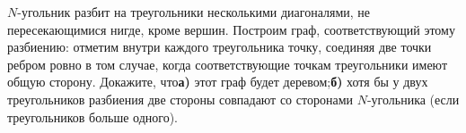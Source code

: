 \documentclass[10pt,a4paper]{article}
\newlength{\shirinaokna}\setlength{\shirinaokna}{12mm}
\newlength{\vysotaokna}\setlength{\vysotaokna}{0.7\baselineskip}
\newcommand{\okno}{\framebox[\shirinaokna]{\rule{0pt}{\vysotaokna}}}
\newlength{\shirinanomera}\setlength{\shirinanomera}{9mm}
\newlength{\zazor}\setlength{\zazor}{0.6em}
\newcommand{\blok}[1]{\par\noindent #1\par}
\newcommand{\nomer}[2]{\makebox[\shirinanomera][l]{%
  \fbox{\rule{0pt}{\vysotaokna}\textbf{#1}$^{#2}$}}}
\begin{document}
\begin{samepage}
\blok{\nomer{13}{\star}\hspace{\zazor}$N$-угольник разбит на треугольники несколькими диагоналями, не пересекающимися нигде, кроме вершин. Построим граф, соответствующий этому разбиению: отметим внутри каждого треугольника точку, соединяя две точки ребром ровно в том случае, когда соответствующие точкам треугольники имеют общую сторону. Докажите, что\hspace{\zazor}\okno\hspace{\zazor}\textbf{а)} этот граф будет деревом;\hspace{\zazor}\okno\hspace{\zazor}\textbf{б)} хотя бы у двух треугольников разбиения две стороны совпадают со сторонами $N$-угольника (если треугольников больше одного).}
\end{samepage}\par\vspace{7pt}
\end{document}

